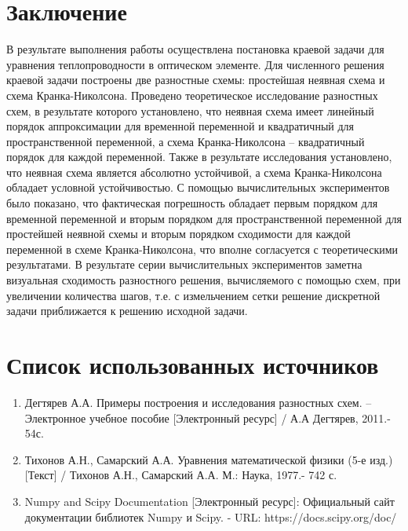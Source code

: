 {\section*{Заключение}
{
	В результате выполнения работы осуществлена постановка краевой
задачи для уравнения теплопроводности в оптическом элементе. Для
численного решения краевой задачи построены две разностные схемы:
простейшая неявная схема и схема Кранка-Николсона.
Проведено теоретическое исследование разностных схем, в результате
которого установлено, что неявная схема имеет линейный
порядок аппроксимации для временной переменной и квадратичный для
пространственной переменной, а схема Кранка-Николсона -- квадратичный порядок для каждой переменной. Также в результате исследования установлено,
что неявная схема является абсолютно устойчивой, а схема Кранка-Николсона обладает условной
устойчивостью.
С помощью вычислительных экспериментов было показано, что
фактическая погрешность обладает первым порядком для временной
переменной и вторым порядком для пространственной переменной для простейшей неявной схемы и вторым порядком сходимости для каждой переменной в схеме Кранка-Николсона, что
вполне согласуется с теоретическими результатами.
В результате серии вычислительных экспериментов заметна визуальная
сходимость разностного решения, вычисляемого с помощью схем, при
увеличении количества шагов, т.е. с измельчением сетки решение дискретной
задачи приближается к решению исходной задачи.
}

\newpage

\section*{Список использованных источников}
{
	\begin{enumerate}[label=\arabic*\ \ ]
	\item {Дегтярев А.А. Примеры построения и исследования разностных схем. – Электронное учебное пособие [Электронный ресурс] / А.А Дегтярев, 2011.- 54с.}
	\item {Тихонов А.Н., Самарский А.А. Уравнения математической физики (5-е изд.) [Текст] / Тихонов А.Н., Самарский А.А. М.: Наука, 1977.- 742 с.}
	
	\item {Numpy and Scipy Documentation [Электронный ресурс]: Официальный сайт документации библиотек Numpy и Scipy. - URL: https://docs.scipy.org/doc/}
	

\end{enumerate}}}
